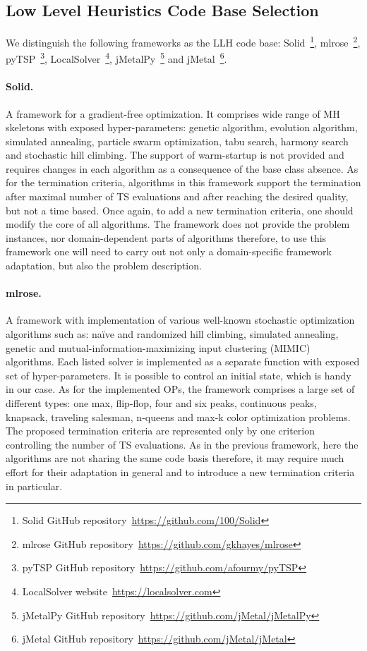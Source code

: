 \subsection{Low Level Heuristics Code Base Selection}\label{implementation:llh code basis selection}
We distinguish the following frameworks as the LLH code base: Solid~\footnote{Solid GitHub repository~\url{https://github.com/100/Solid}}, mlrose~\footnote{mlrose GitHub repository~\url{https://github.com/gkhayes/mlrose}}, pyTSP~\footnote{pyTSP GitHub repository~\url{https://github.com/afourmy/pyTSP}}, LocalSolver~\footnote{LocalSolver website~\url{https://localsolver.com}}, jMetalPy~\footnote{jMetalPy GitHub repository~\url{https://github.com/jMetal/jMetalPy}} and jMetal~\footnote{jMetal GitHub repository~\url{https://github.com/jMetal/jMetal}}.

\paragraph{Solid.} A framework for a gradient-free optimization. It comprises wide range of MH skeletons with exposed hyper-parameters: genetic algorithm, evolution algorithm, simulated annealing, particle swarm optimization, tabu search, harmony search and stochastic hill climbing. The support of warm-startup is not provided and requires changes in each algorithm as a consequence of the base class absence. As for the termination criteria, algorithms in this framework support the termination after maximal number of TS evaluations and after reaching the desired quality, but not a time based. Once again, to add a new termination criteria, one should modify the core of all algorithms. The framework does not provide the problem instances, nor domain-dependent parts of algorithms therefore, to use this framework one will need to carry out not only a domain-specific framework adaptation, but also the problem description.

\paragraph{mlrose.} A framework with implementation of various well-known stochastic optimization algorithms such as: na\"ive and randomized hill climbing, simulated annealing, genetic and mutual-information-maximizing input clustering (MIMIC) algorithms. Each listed solver is implemented as a separate function with exposed set of hyper-parameters. It is possible to control an initial state, which is handy in our case. As for the implemented OPs, the framework comprises a large set of different types: one max, flip-flop, four and six peaks, continuous peaks, knapsack, traveling salesman, n-queens and max-k color optimization problems. The proposed termination criteria are represented only by one criterion controlling the number of TS evaluations. As in the previous framework, here the algorithms are not sharing the same code basis therefore, it may require much effort for their adaptation in general and to introduce a new termination criteria in particular.

